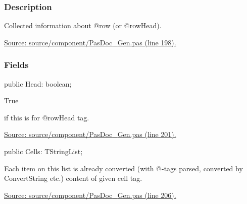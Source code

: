 \documentclass{report}
\newif\ifpdf
\begin{document}
\subsubsection*{\large{\textbf{Description}}\normalsize\hspace{1ex}\hfill}
Collected information about @row (or @rowHead).\par
\href{https://github.com/pasdoc/pasdoc/blob/master/source/component/PasDoc_Gen.pas#L198}{Source: source/component/PasDoc{\_}Gen.pas (line 198).}\subsubsection*{\large{\textbf{Fields}}\normalsize\hspace{1ex}\hfill}
\begin{list}{}{
\setlength{\itemindent}{0cm}
\setlength{\listparindent}{0cm}
\setlength{\leftmargin}{\evensidemargin}
\addtolength{\leftmargin}{\tmplength}
\settowidth{\labelsep}{X}
\addtolength{\leftmargin}{\labelsep}
\setlength{\labelwidth}{\tmplength}
}
\label{PasDoc_Gen.TRowData-Head}
\item[\textbf{Head}\hfill]
\ifpdf
\begin{flushleft}
\fi
\begin{ttfamily}
public Head: boolean;\end{ttfamily}

\ifpdf
\end{flushleft}
\fi


\par \begin{ttfamily}True\end{ttfamily} if this is for @rowHead tag.\par
\href{https://github.com/pasdoc/pasdoc/blob/master/source/component/PasDoc_Gen.pas#L201}{Source: source/component/PasDoc{\_}Gen.pas (line 201).}\label{PasDoc_Gen.TRowData-Cells}
\item[\textbf{Cells}\hfill]
\ifpdf
\begin{flushleft}
\fi
\begin{ttfamily}
public Cells: TStringList;\end{ttfamily}

\ifpdf
\end{flushleft}
\fi


\par Each item on this list is already converted (with @{-}tags parsed, converted by ConvertString etc.) content of given cell tag.\par
\href{https://github.com/pasdoc/pasdoc/blob/master/source/component/PasDoc_Gen.pas#L206}{Source: source/component/PasDoc{\_}Gen.pas (line 206).}\end{list}
\end{document}
